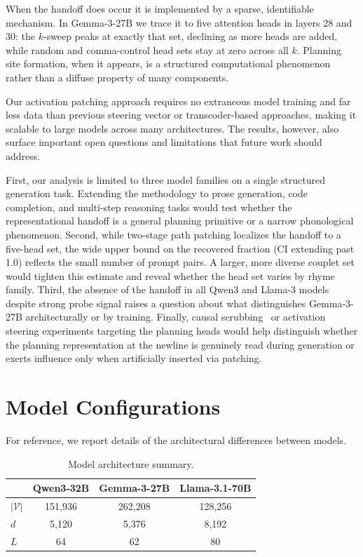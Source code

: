 \documentclass{article}
\begin{document}
When the handoff does occur it is implemented by a sparse, identifiable mechanism. In Gemma-3-27B we trace it to five attention heads in layers 28 and 30: the $k$-sweep peaks at exactly that set, declining as more heads are added, while random and comma-control head sets stay at zero across all $k$. Planning site formation, when it appears, is a structured computational phenomenon rather than a diffuse property of many components.

Our activation patching approach requires no extraneous model training and far less data than previous steering vector or transcoder-based approaches, making it scalable to large models across many architectures. The results, however, also surface important open questions and limitations that future work should address.

First, our analysis is limited to three model families on a single structured generation task. Extending the methodology to prose generation, code completion, and multi-step reasoning tasks would test whether the representational handoff is a general planning primitive or a narrow phonological phenomenon. Second, while two-stage path patching localizes the handoff to a five-head set, the wide upper bound on the recovered fraction (CI extending past 1.0) reflects the small number of prompt pairs. A larger, more diverse couplet set would tighten this estimate and reveal whether the head set varies by rhyme family. Third, the absence of the handoff in all Qwen3 and Llama-3 models despite strong probe signal raises a question about what distinguishes Gemma-3-27B architecturally or by training. Finally, causal scrubbing~\citep{chan2022causal} or activation steering experiments targeting the planning heads would help distinguish whether the planning representation at the newline is genuinely read during generation or exerts influence only when artificially inserted via patching.





\appendix

\section{Model Configurations}
\label{sec:model-config}
For reference, we report details of the architectural differences between models.

\begin{table}[h]
\centering
\begin{tabular}{lccc}
\toprule
 & Qwen3-32B & Gemma-3-27B  & Llama-3.1-70B \\
\midrule
$|\mathcal V|$ & 151,936 & 262,208 & 128,256 \\
$d$            & 5,120   & 5,376   & 8,192  \\
$L$            & 64      & 62      & 80     \\
\bottomrule
\end{tabular}
\caption{Model architecture summary.}
\label{tab:models}
\end{table}
\end{document}
